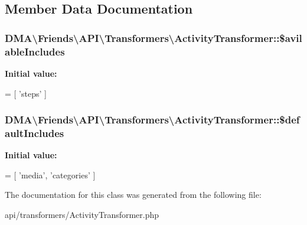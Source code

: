 \subsection{Member Data Documentation}
\hypertarget{classDMA_1_1Friends_1_1API_1_1Transformers_1_1ActivityTransformer_ad7fbb8c6b7a80665f57afec58d71778c}{}
\subsubsection[{\$avilable\+Includes}]{\setlength{\rightskip}{0pt plus 5cm}D\+M\+A\textbackslash{}\+Friends\textbackslash{}\+A\+P\+I\textbackslash{}\+Transformers\textbackslash{}\+Activity\+Transformer\+::\$avilable\+Includes\hspace{0.3cm}{\ttfamily [protected]}}\label{classDMA_1_1Friends_1_1API_1_1Transformers_1_1ActivityTransformer_ad7fbb8c6b7a80665f57afec58d71778c}
{\bfseries Initial value\+:}
\begin{DoxyCode}
= [
            \textcolor{stringliteral}{'steps'}
    ]
\end{DoxyCode}
\hypertarget{classDMA_1_1Friends_1_1API_1_1Transformers_1_1ActivityTransformer_a0f55e7ec2bc294c76b7145d322464900}{}
\subsubsection[{\$default\+Includes}]{\setlength{\rightskip}{0pt plus 5cm}D\+M\+A\textbackslash{}\+Friends\textbackslash{}\+A\+P\+I\textbackslash{}\+Transformers\textbackslash{}\+Activity\+Transformer\+::\$default\+Includes\hspace{0.3cm}{\ttfamily [protected]}}\label{classDMA_1_1Friends_1_1API_1_1Transformers_1_1ActivityTransformer_a0f55e7ec2bc294c76b7145d322464900}
{\bfseries Initial value\+:}
\begin{DoxyCode}
= [
            \textcolor{stringliteral}{'media'},
            \textcolor{stringliteral}{'categories'}
    ]
\end{DoxyCode}


The documentation for this class was generated from the following file\+:\begin{DoxyCompactItemize}
\item 
api/transformers/Activity\+Transformer.\+php\end{DoxyCompactItemize}
